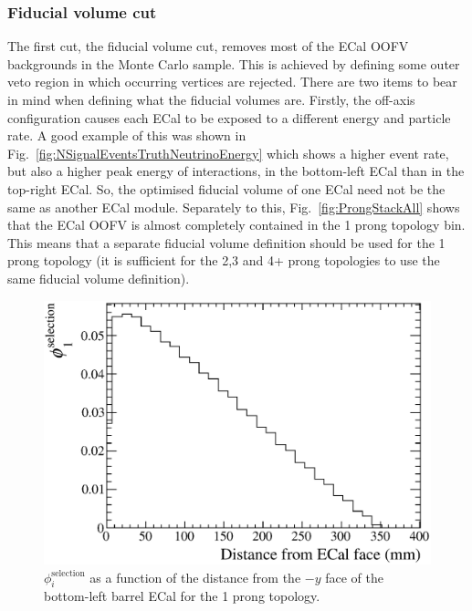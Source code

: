 \subsubsection{Fiducial volume cut}
\label{subsubsec:FVCut}
The first cut, the fiducial volume cut, removes most of the ECal OOFV backgrounds in the Monte Carlo sample.  This is achieved by defining some outer veto region in which occurring vertices are rejected.  There are two items to bear in mind when defining what the fiducial volumes are.  Firstly, the off-axis configuration causes each ECal to be exposed to a different energy and particle rate.  A good example of this was shown in Fig.~\ref{fig:NSignalEventsTruthNeutrinoEnergy} which shows a higher event rate, but also a higher peak energy of interactions, in the bottom-left ECal than in the top-right ECal.  So, the optimised fiducial volume of one ECal need not be the same as another ECal module.  Separately to this, Fig.~\ref{fig:ProngStackAll} shows that the ECal OOFV is almost completely contained in the 1 prong topology bin.  This means that a separate fiducial volume definition should be used for the 1 prong topology (it is sufficient for the 2,3 and 4+ prong topologies to use the same fiducial volume definition).
\newline
\newline
\begin{figure}
  \centering
  \includegraphics[width=12cm]{images/selection/mc_selection/FV_BLB_1Prong_NegY.eps}
  \caption{$\phi_i^{\textrm{selection}}$ as a function of the distance from the $-y$ face of the bottom-left barrel ECal for the 1 prong topology.}
  \label{fig:FVBLB1ProngNegY}
\end{figure}
